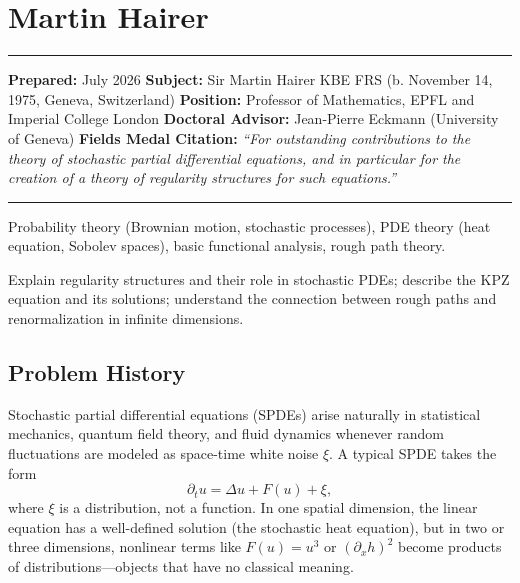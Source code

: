 \chapter{Martin Hairer}\label{ch2014martinhairer:martin-hairer-fields-medal-2014-a-comprehensive-report-on-his-work-and-impact}

\begin{center}\rule{0.5\linewidth}{0.5pt}\end{center}

\textbf{Prepared:} July 2026 \textbf{Subject:} Sir Martin Hairer KBE FRS (b. November 14, 1975, Geneva, Switzerland) \textbf{Position:} Professor of Mathematics, EPFL and Imperial College London \textbf{Doctoral Advisor:} Jean-Pierre Eckmann (University of Geneva) \textbf{Fields Medal Citation:} \emph{``For outstanding contributions to the theory of stochastic partial differential equations, and in particular for the creation of a theory of regularity structures for such equations.''}

\begin{center}\rule{0.5\linewidth}{0.5pt}\end{center}

\begin{prereqs} Probability theory (Brownian motion, stochastic processes), PDE theory (heat equation, Sobolev spaces), basic functional analysis, rough path theory. \end{prereqs}

\begin{objectives} Explain regularity structures and their role in stochastic PDEs; describe the KPZ equation and its solutions; understand the connection between rough paths and renormalization in infinite dimensions. \end{objectives}

\section{Problem History}

Stochastic partial differential equations (SPDEs) arise naturally in statistical mechanics, quantum field theory, and fluid dynamics whenever random fluctuations are modeled as space-time white noise $\xi$. A typical SPDE takes the form
\[
\partial_t u = \Delta u + F(u) + \xi,
\]
where $\xi$ is a distribution, not a function. In one spatial dimension, the linear equation has a well-defined solution (the stochastic heat equation), but in two or three dimensions, nonlinear terms like $F(u) = u^3$ or $(\partial_x h)^2$ become products of distributions---objects that have no classical meaning.

